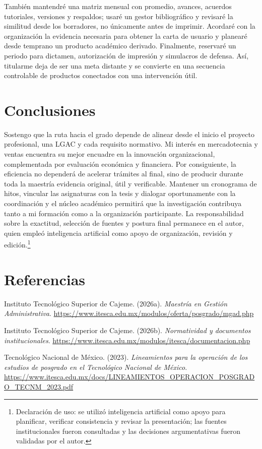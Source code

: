 \documentclass[spanish,letterpaper,oneside]{article}
\newenvironment{apareferences}{%
  \begin{list}{}{\setlength{\leftmargin}{1.27cm}%
    \setlength{\itemindent}{-1.27cm}%
    \setlength{\itemsep}{0.8\baselineskip}%
    \setlength{\parsep}{0pt}}}{\end{list}}
\begin{document}
También mantendré una matriz mensual con promedio, avances, acuerdos tutoriales, versiones y respaldos; usaré un gestor bibliográfico y revisaré la similitud desde los borradores, no únicamente antes de imprimir. Acordaré con la organización la evidencia necesaria para obtener la carta de usuario y planearé desde temprano un producto académico derivado. Finalmente, reservaré un periodo para dictamen, autorización de impresión y simulacros de defensa. Así, titularme deja de ser una meta distante y se convierte en una secuencia controlable de productos conectados con una intervención útil.

\clearpage
\section{Conclusiones}

Sostengo que la ruta hacia el grado depende de alinear desde el inicio el proyecto profesional, una LGAC y cada requisito normativo. Mi interés en mercadotecnia y ventas encuentra su mejor encuadre en la innovación organizacional, complementada por evaluación económica y financiera. Por consiguiente, la eficiencia no dependerá de acelerar trámites al final, sino de producir durante toda la maestría evidencia original, útil y verificable. Mantener un cronograma de hitos, vincular las asignaturas con la tesis y dialogar oportunamente con la coordinación y el núcleo académico permitirá que la investigación contribuya tanto a mi formación como a la organización participante. La responsabilidad sobre la exactitud, selección de fuentes y postura final permanece en el autor, quien empleó inteligencia artificial como apoyo de organización, revisión y edición.\footnote{Declaración de uso: se utilizó inteligencia artificial como apoyo para planificar, verificar consistencia y revisar la presentación; las fuentes institucionales fueron consultadas y las decisiones argumentativas fueron validadas por el autor.}

\clearpage
\section*{Referencias}
\begin{apareferences}
  \item Instituto Tecnológico Superior de Cajeme. (2026a). \emph{Maestría en Gestión Administrativa}. \url{https://www.itesca.edu.mx/modulos/oferta/posgrado/mgad.php}

  \item Instituto Tecnológico Superior de Cajeme. (2026b). \emph{Normatividad y documentos institucionales}. \url{https://www.itesca.edu.mx/modulos/itesca/documentacion.php}

  \item Tecnológico Nacional de México. (2023). \emph{Lineamientos para la operación de los estudios de posgrado en el Tecnológico Nacional de México}. \url{https://www.itesca.edu.mx/docs/LINEAMIENTOS_OPERACION_POSGRADO_TECNM_2023.pdf}
\end{apareferences}
\end{document}
